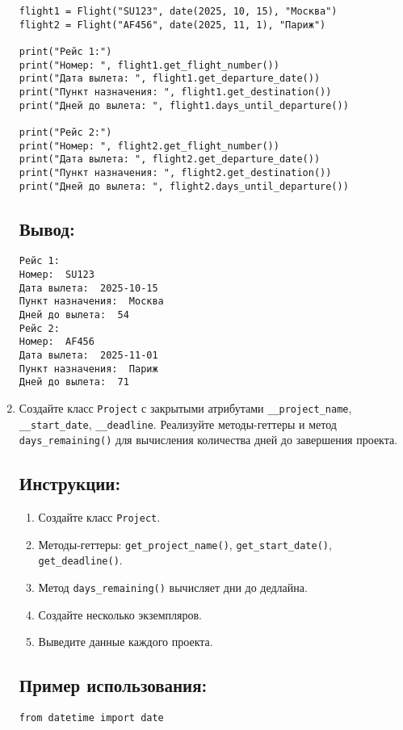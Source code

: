 \begin{enumerate}
\begin{lstlisting}[caption=Пример кода]
flight1 = Flight("SU123", date(2025, 10, 15), "Москва")
flight2 = Flight("AF456", date(2025, 11, 1), "Париж")

print("Рейс 1:")
print("Номер: ", flight1.get_flight_number())
print("Дата вылета: ", flight1.get_departure_date())
print("Пункт назначения: ", flight1.get_destination())
print("Дней до вылета: ", flight1.days_until_departure())

print("Рейс 2:")
print("Номер: ", flight2.get_flight_number())
print("Дата вылета: ", flight2.get_departure_date())
print("Пункт назначения: ", flight2.get_destination())
print("Дней до вылета: ", flight2.days_until_departure())
\end{lstlisting}

\subsection*{Вывод:}
\begin{lstlisting}[caption=Ожидаемый вывод]
Рейс 1:
Номер:  SU123
Дата вылета:  2025-10-15
Пункт назначения:  Москва
Дней до вылета:  54
Рейс 2:
Номер:  AF456
Дата вылета:  2025-11-01
Пункт назначения:  Париж
Дней до вылета:  71
\end{lstlisting}

\item
Создайте класс \texttt{Project} с закрытыми атрибутами \texttt{\_\_project\_name}, \texttt{\_\_start\_date}, \texttt{\_\_deadline}. Реализуйте методы-геттеры и метод \texttt{days\_remaining()} для вычисления количества дней до завершения проекта.

\subsection*{Инструкции:}
\begin{enumerate}
    \item Создайте класс \texttt{Project}.
    \item Методы-геттеры: \texttt{get\_project\_name()}, \texttt{get\_start\_date()}, \texttt{get\_deadline()}.
    \item Метод \texttt{days\_remaining()} вычисляет дни до дедлайна.
    \item Создайте несколько экземпляров.
    \item Выведите данные каждого проекта.
\end{enumerate}

\subsection*{Пример использования:}
\begin{lstlisting}[caption=Пример кода]
from datetime import date


\end{lstlisting}
\end{enumerate}
